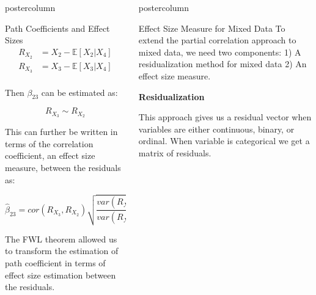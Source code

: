 \documentclass{beamer}
\newlength{\columnheight}
\begin{document}
\begin{frame}
\begin{columns}
\begin{column}{.33\textwidth}
\begin{beamercolorbox}[center]{postercolumn}
\begin{minipage}{.98\textwidth}
{\begin{myblock}{Path Coefficients and Effect Sizes}
		\begin{equation*}
			\begin{split}
				R_{X_2} &= X_2 - \mathbb{E}[X_2 | X_4] \\
				R_{X_3} &= X_3 - \mathbb{E}[X_3 | X_4] \\
			\end{split}
		\end{equation*}

		Then $ \beta_{23} $ can be estimated as:

		\begin{equation*}
			R_{X_3} \sim R_{X_2}
		\end{equation*}

		This can further be written in terms of the correlation
		coefficient, an effect size measure, between the residuals as:

		\begin{equation*}
			\hat{\beta}_{23} = cor(R_{X_3}, R_{X_2}) \sqrt{\frac{var(R_{X_3})}{var(R_{X_2})}}
		\end{equation*}
		
		The FWL theorem allowed us to transform the estimation of path coefficient in terms of
		effect size estimation between the residuals.
		
	\end{myblock}\vfill
		}\end{minipage}\end{beamercolorbox}
	\end{column}


	\begin{column}{.33\textwidth}
		\begin{beamercolorbox}[center]{postercolumn}
			\begin{minipage}{.98\textwidth} %
				\parbox[t][\columnheight]{\textwidth}{ %
	\begin{myblock}{Effect Size Measure for Mixed Data}
		To extend the partial correlation approach to mixed data, we need two components: 1) A residualization method for mixed data 2) An effect size
		measure.

		\textbf{Residualization}

		This approach gives us a residual vector when variables are
		either continuous, binary, or ordinal. When variable is
		categorical we get a matrix of residuals.
	

\end{myblock}}
\end{minipage}
\end{beamercolorbox}
\end{column}
\end{columns}
\end{frame}
\end{document}
